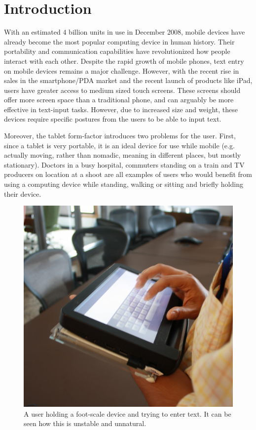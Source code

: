 \section{Introduction}

With an estimated 4 billion units in use in December 2008, mobile
devices have already become the most popular computing device in human
history. Their portability and communication capabilities have
revolutionized how people interact with each other. Despite the rapid
growth of mobile phones, text entry on mobile devices remains a major
challenge. However, with the recent rise in sales in the
smartphone/PDA market and the recent launch of products like iPad,
users have greater access to medium sized touch screens. These screens
should offer more screen space than a traditional phone, and can
arguably be more effective in text-input tasks. However, due to
increased size and weight, these devices require specific postures
from the users to be able to input text.

Moreover, the tablet form-factor introduces two problems for the user.
First, since a tablet is very portable, it is an ideal device for use
while mobile (e.g. actually moving, rather than nomadic, meaning in
different places, but mostly stationary).  Doctors in a busy hospital,
commuters standing on a train and TV producers on location at a shoot
are all examples of users who would benefit from using a computing
device while standing, walking or sitting and briefly holding their
device.

\begin{figure}
    \includegraphics[scale=0.35]{Figures/device_hold.pdf} 
  	\caption{A user holding a foot-scale device and trying to enter text. It can be seen how this is unstable and unnatural.}
\end{figure}

